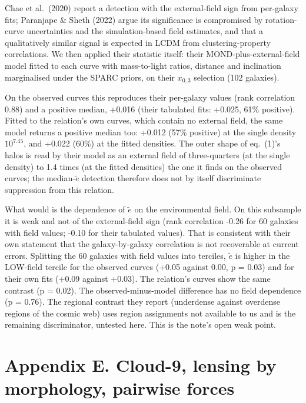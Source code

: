 \documentclass[
  10pt,
]{article}
\begin{document}
Chae et al.~(2020) report a detection with the external-field sign from per-galaxy fits; Paranjape \& Sheth (2022) argue its significance is compromised by rotation-curve uncertainties and the simulation-based field estimates, and that a qualitatively similar signal is expected in LCDM from clustering-property correlations. We then applied their statistic itself: their MOND-plus-external-field model fitted to each curve with mass-to-light ratios, distance and inclination marginalised under the SPARC priors, on their $x_{0,3}$ selection (102 galaxies).

On the observed curves this reproduces their per-galaxy values (rank correlation 0.88) and a positive median, +0.016 (their tabulated fits: +0.025, 61\% positive). Fitted to the relation's own curves, which contain no external field, the same model returns a positive median too: +0.012 (57\% positive) at the single density $10^{7.45}$, and +0.022 (60\%) at the fitted densities. The outer shape of eq.~(1)'s halos is read by their model as an external field of three-quarters (at the single density) to 1.4 times (at the fitted densities) the one it finds on the observed curves; the median-$\tilde e$ detection therefore does not by itself discriminate suppression from this relation.

What would is the dependence of $\tilde e$ on the environmental field. On this subsample it is weak and not of the external-field sign (rank correlation -0.26 for 60 galaxies with field values; -0.10 for their tabulated values). That is consistent with their own statement that the galaxy-by-galaxy correlation is not recoverable at current errors. Splitting the 60 galaxies with field values into terciles, $\tilde e$ is higher in the LOW-field tercile for the observed curves (+0.05 against 0.00, p = 0.03) and for their own fits (+0.09 against +0.03). The relation's curves show the same contrast (p = 0.02). The observed-minus-model difference has no field dependence (p = 0.76). The regional contrast they report (underdense against overdense regions of the cosmic web) uses region assignments not available to us and is the remaining discriminator, untested here. This is the note's open weak point.

\section{Appendix E. Cloud-9, lensing by morphology, pairwise forces}\label{appendix-e.-cloud-9-lensing-by-morphology-pairwise-forces}
\end{document}

